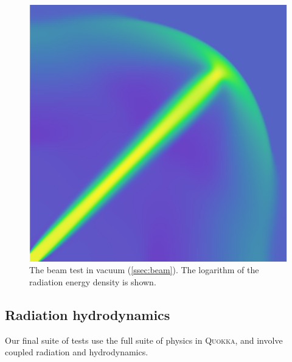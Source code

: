 \documentclass[fleqn,usenatbib]{mnras}
\newcommand{\quokka}{\textsc{Quokka}}
\begin{document}
\begin{figure}
    \includegraphics[width=\columnwidth]{beam2.png}
    \caption{The beam test in vacuum (\autoref{ssec:beam}). The logarithm of the radiation energy density is shown.}
    \label{fig:beam}
\end{figure}

\subsection{Radiation hydrodynamics}
\label{ssec:radhydro_tests}

Our final suite of tests use the full suite of physics in \quokka, and involve coupled radiation and hydrodynamics.
\end{document}

